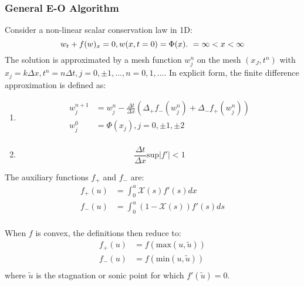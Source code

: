 \documentclass[a4paper]{article}
\begin{document}
\subsubsection{General E-O Algorithm}
Consider a non-linear scalar conservation law in 1D:
\begin{equation}
    w_t + f(w)_x = 0,\\ w(x,t=0) = \Phi(x). \ =\infty < x< \infty
\end{equation}
The solution is approximated by a mesh function $w_j^n$ on the mesh ${(x_J,t^n)}$ with $x_j = k \Delta x, t^n = n \Delta t, j = 0, \pm 1,...,n=0,1,...$. In explicit form, the finite difference approximation is defined as:
\begin{enumerate}
    \item 
\begin{equation}
    \begin{split}
        w_j^{n+1} &= w_j^n - \frac{\Delta t}{\Delta x}\left(\Delta_{+} f_{-} (w_j^n) + \Delta_{-} f_{+} (w_j^n) \right) \\
        w_j^0 &= \Phi(x_j), j = 0, \pm 1, \pm 2\\
    \end{split}
\end{equation}
    \item
        \begin{equation}
            \frac{\Delta t}{\Delta x} \text{sup} |f'| < 1
        \end{equation}

\end{enumerate}

The auxiliary functions $f_+$ and $f_-$ are:
\begin{equation}
    \begin{split}
        f_+ (u) &= \int_0^u \mathcal{X} (s) f'(s) dx\\
        f_- (u) &= \int_0^u (1 - \mathcal{X}(s)) f'(s)ds\\
    \end{split}
\end{equation}

When $f$ is convex, the definitions then reduce to:
\begin{equation}
    \begin{split}
        f_+ (u) &= f(\mathrm{max}(u,\tilde{u}))\\
        f_- (u) &= f(\mathrm{min}(u,\tilde{u})) \\
    \end{split}
\end{equation}
where $\tilde{u}$ is the stagnation or sonic point for which $f'(\tilde{u}) = 0$. 
\end{document}
